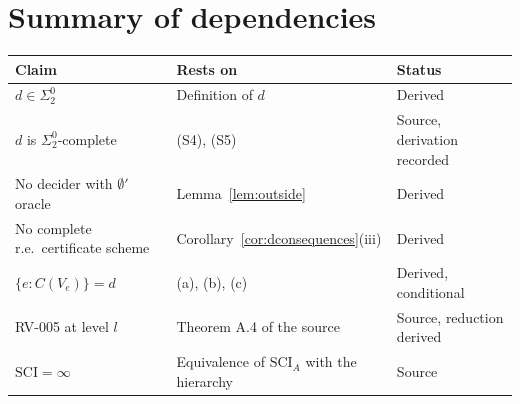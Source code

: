 \section{Summary of dependencies}

\begin{center}
\small
\begin{tabular}{@{}p{3.6cm}p{5.4cm}p{3.2cm}@{}}
\toprule
Claim & Rests on & Status \\
\midrule
$d\in\Sigma^0_2$ & Definition of $d$ & Derived \\
$d$ is $\Sigma^0_2$-complete & (S4), (S5) & Source, derivation recorded \\
No decider with $\emptyset'$ oracle & Lemma~\ref{lem:outside} & Derived \\
No complete r.e.\ certificate scheme & Corollary~\ref{cor:dconsequences}(iii) & Derived \\
$\{e:C(V_e)\}=d$ & (a), (b), (c) & Derived, conditional \\
RV-005 at level $l$ & Theorem A.4 of the source & Source, reduction derived \\
$\mathrm{SCI}=\infty$ & Equivalence of $\mathrm{SCI}_A$ with the hierarchy & Source \\
\bottomrule
\end{tabular}
\end{center}

